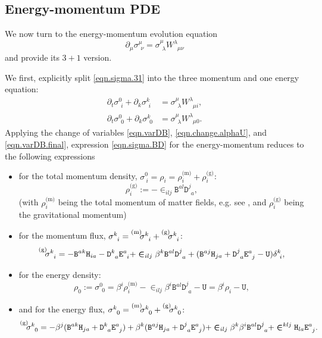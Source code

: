 \documentclass[
10pt, %
a4paper, %
oneside, %
headinclude,footinclude, %
BCOR5mm, %
]{scrartcl}
\newcommand{\pd}[1]{\partial_{#1}}
\newcommand{\Dfin}[2]{\mathtt{D}_{\phantom{#2}#1}^{#2}}	%
\newcommand{\Hfin}[2]{\mathtt{H}_{#2#1}}	%
\newcommand{\Efin}[2]{\mathtt{E}^{#1}_{\phantom{#1}#2}}	%
\newcommand{\Ufin}{\mathtt{U}}
\newcommand{\Bfin}[2]{\mathtt{B}^{#1#2}}	%
\newcommand{\w}[2]{W^{#1}_{\phantom{#1}#2}}
\newcommand{\EMmat}[2]{\sigma^{#1}_{\ \,#2}}
\newcommand{\LCsymb}{\bm{\in}}    %
\newcommand{\mat}[1]{\prescript{\text{(m)}}{}{\hspace{-0.1cm}#1}}
\newcommand{\gra}[1]{\prescript{\text{(g)}}{}{\hspace{-0.1cm}#1}}
\newcommand{\KD}[2]{\delta^{#1}_{\ #2}}
\newcommand{\shift}[1]{\beta^{#1}}
\begin{document}
\subsection{Energy-momentum PDE}\label{sec.energymomentum}

We now turn to the energy-momentum evolution equation
\begin{equation}\label{eqn.sigma.31}
	\pd{\mu}\EMmat{\mu}{\nu} 
	 = \EMmat{\mu}{\lambda} 
	\w{\lambda}{\mu\nu}
\end{equation}
and provide its $ 3+1 $ version.

We first, explicitly split \eqref{eqn.sigma.31} into the three momentum and one energy equation:
\begin{subequations}\label{eqn.EM.sigma}
	\begin{align}
		\pd{t}\EMmat{0}{i} + \pd{k}\EMmat{k}{i}
		& = \EMmat{\mu}{\lambda} 
		\w{\lambda}{\mu i},\\[2mm]
		\pd{t}\EMmat{0}{0} + \pd{k}\EMmat{k}{0}
		& = \EMmat{\mu}{\lambda} 
		\w{\lambda}{\mu 0}.
	\end{align}
\end{subequations}
Applying the change of variables \eqref{eqn.varDB}, \eqref{eqn.change.alphaU}, and 
\eqref{eqn.varDB.final}, expression \eqref{eqn.sigma.BD} for the energy-momentum reduces to the 
following expressions
\begin{itemize}
	\item 
	for the total momentum density, $ \sigma^0_{\ i} = \rho_i = \rho^\text{(m)}_i + 
	\rho^\text{(g)}_i $:
	\begin{equation}\label{eqn.sigma0i}
		\rho^\text{(g)}_i :=-\LCsymb_{ilj} \Bfin{a}{l}\Dfin{a}{j},
	\end{equation}
	(with $ \rho^\text{(m)}_i $ being the total momentum of matter fields, e.g. see 
	\cite{PTRSA2020}, and $ \rho^\text{(g)}_i 
	$ 
	being the gravitational momentum)
	\item
	for the momentum flux, $ \EMmat{k}{i} = \mat{\EMmat{k}{i}} + \gra{\EMmat{k}{i}}$:
	\begin{equation}\label{eqn.sigmaki}
		\gra{\EMmat{k}{i}} = -\Bfin{a}{k} \Hfin{a}{i} - \Dfin{a}{k} \Efin{a}{i} + 
		\LCsymb_{ilj} 
		\beta^k \Bfin{a}{l}\Dfin{a}{j} + (\Bfin{a}{j} \Hfin{a}{j} + \Dfin{a}{j} \Efin{a}{j} 
		- \Ufin)\KD{k}{i},
	\end{equation}
	\item
	for the energy density:
	\begin{equation}\label{eqn.sigma00}
		\rho_0 :=\EMmat{0}{0} = \shift{i} \rho^\text{(m)}_i - \LCsymb_{ilj} 
		\beta^i\Bfin{a}{l}\Dfin{a}{j} - \Ufin = \beta^i 
		\rho_i 
		- \Ufin,
	\end{equation}
	\item
	and for the energy flux, $ \EMmat{k}{0} = \mat{\EMmat{k}{0}}+\gra{\EMmat{k}{0}}$:
	\begin{equation}\label{eqn.sigmak0}
		\gra{\EMmat{k}{0}} = -\beta^j( \Bfin{a}{k} \Hfin{a}{j} + \Dfin{a}{k} \Efin{a}{j})
		+
		\beta^k( \Bfin{a}{j} \Hfin{a}{j} + \Dfin{a}{j} \Efin{a}{j})
		+
		\LCsymb_{ilj}\beta^k\beta^i\Bfin{a}{l}\Dfin{a}{j}
		+
		\LCsymb^{klj} \Hfin{a}{l} \Efin{a}{j}.
	\end{equation}
\end{itemize}
\end{document}
